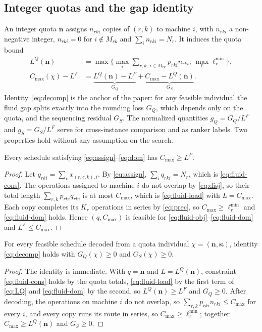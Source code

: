 \subsection{Integer quotas and the gap identity}\label{sec:gap}
An integer quota $\mathbf{n}$ assigns $n_{rki}$ copies of $(r,k)$ to machine $i$, with $n_{rki}$ a non-negative integer,
$n_{rki} = 0$ for $i \notin M_{rk}$ and $\sum_i n_{rki} = N_r$. It induces the quota bound
\begin{align}
L^Q(\mathbf{n}) &= \max\{ \max_i \textstyle\sum_{r,k:\, i \in M_{rk}} p_{rki} n_{rki},\, \max_r \ell_r^{\min} \}, \label{eq:LQ}\\
C_{\max}(\chi) - L^F &= \underbrace{L^Q(\mathbf{n}) - L^F}_{G_Q} + \underbrace{C_{\max} - L^Q(\mathbf{n})}_{G_S}. \label{eq:decomp}
\end{align}
Identity~\eqref{eq:decomp} is the anchor of the paper: for any feasible individual the fluid gap splits exactly into the
rounding loss $G_Q$, which depends only on the quota, and the sequencing residual $G_S$. The normalized quantities
$g_Q = G_Q/L^F$ and $g_S = G_S/L^F$ serve for cross-instance comparison and as ranker labels. Two properties hold without
any assumption on the search.

\begin{proposition}\label{prop:fluidlb}
Every schedule satisfying \eqref{eq:assign}--\eqref{eq:dom} has $C_{\max} \ge L^F$.
\end{proposition}
\begin{proof}
Let $q_{rki} = \sum_c x_{(r,c,k),i}$. By \eqref{eq:assign}, $\sum_i q_{rki} = N_r$, which is \eqref{eq:fluid-cons}. The
operations assigned to machine $i$ do not overlap by \eqref{eq:disj}, so their total length $\sum_{r,k} p_{rki} q_{rki}$ is at
most $C_{\max}$, which is \eqref{eq:fluid-load} with $L = C_{\max}$. Each copy completes its $K_r$ operations in series by
\eqref{eq:prec}, so $C_{\max} \ge \ell_r^{\min}$ and \eqref{eq:fluid-dom} holds. Hence $(q, C_{\max})$ is feasible for
\eqref{eq:fluid-obj}--\eqref{eq:fluid-dom} and $L^F \le C_{\max}$.
\end{proof}

\begin{proposition}\label{prop:decomp}
For every feasible schedule decoded from a quota individual $\chi = (\mathbf{n}, \boldsymbol{\kappa})$, identity
\eqref{eq:decomp} holds with $G_Q(\chi) \ge 0$ and $G_S(\chi) \ge 0$.
\end{proposition}
\begin{proof}
The identity is immediate. With $q = \mathbf{n}$ and $L = L^Q(\mathbf{n})$, constraint \eqref{eq:fluid-cons} holds by
the quota totals, \eqref{eq:fluid-load} by the first term of \eqref{eq:LQ} and \eqref{eq:fluid-dom} by the second, so
$L^Q(\mathbf{n}) \ge L^F$ and $G_Q \ge 0$. After decoding, the operations on machine $i$ do not overlap, so
$\sum_{r,k} p_{rki} n_{rki} \le C_{\max}$ for every $i$, and every copy runs its route in series, so
$C_{\max} \ge \ell_r^{\min}$; together $C_{\max} \ge L^Q(\mathbf{n})$ and $G_S \ge 0$.
\end{proof}
